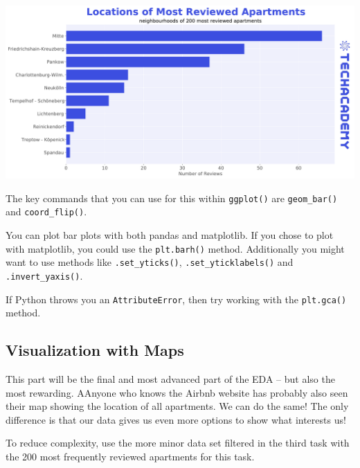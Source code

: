 \documentclass[
  11pt,
]{article}
\newenvironment{tips}[1]
  {
  \begin{itemize}
  \footnotesize
  \renewcommand{\labelitemi}{
    \raisebox{-.7\height}[0pt][0pt]{
      {\setkeys{Gin}{width=3em,keepaspectratio}
        \texttt{[image: images/\#1.png]}}
    }
  }
  \setlength{\fboxsep}{1em}
  \begin{rbox}
  \item
  }
  {
  \end{rbox}
  \end{itemize}
  }
\newenvironment{tipsp}[1]
  {
  \begin{itemize}
  \footnotesize
  \renewcommand{\labelitemi}{
    \raisebox{-.7\height}[0pt][0pt]{
      {\setkeys{Gin}{width=3em,keepaspectratio}
        \texttt{[image: images/\#1.png]}}
    }
  }
  \setlength{\fboxsep}{1em}
  \begin{pbox}
  \item
  }
  {
  \end{pbox}
  \end{itemize}
  }
\begin{document}
\begin{center}\includegraphics[width=1\linewidth]{plot/01_python/hbars_reviews} \end{center}

\begin{tips}r
The key commands that you can use for this within \texttt{ggplot()} are \texttt{geom\_bar()} and \texttt{coord\_flip()}.

\end{tips}

\begin{tipsp}p
You can plot bar plots with both pandas and matplotlib.
If you chose to plot with matplotlib, you could use the \texttt{plt.barh()} method. Additionally you might want to use methods like \texttt{.set\_yticks()}, \texttt{.set\_yticklabels()} and \texttt{.invert\_yaxis()}.

If Python throws you an \texttt{AttributeError}, then try working with the \texttt{plt.gca()} method.

\end{tipsp}

\hypertarget{visualization-with-maps}{%
\subsection{Visualization with Maps}\label{visualization-with-maps}}

This part will be the final and most advanced part of the EDA -- but also the most rewarding. AAnyone who knows the Airbnb website has probably also seen their map showing the location of all apartments. We can do the same! The only difference is that our data gives us even more options to show what interests us!

To reduce complexity, use the more minor data set filtered in the third task with the 200 most frequently reviewed apartments for this task.
\end{document}
